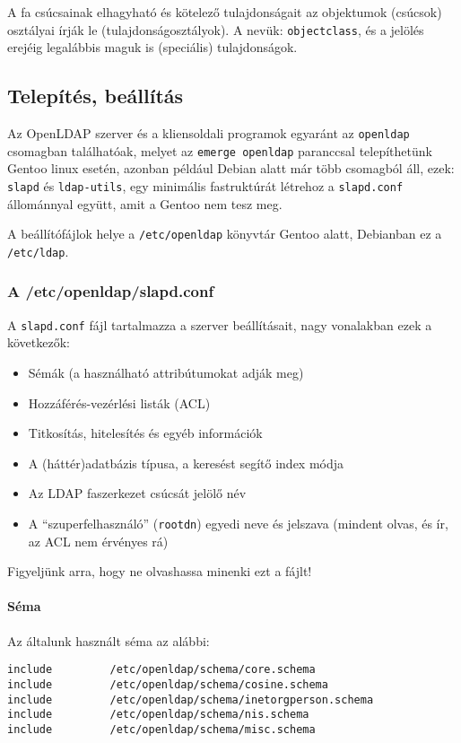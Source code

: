 \documentclass[fleqn,10pt,a4paper,titlepage]{article}
\begin{document}
  A fa csúcsainak elhagyható és kötelező tulajdonságait az objektumok (csúcsok) osztályai írják le
  (tulajdonságosztályok). A nevük: \texttt{objectclass}, és a jelölés erejéig legalábbis  maguk is (speciális)
  tulajdonságok.


  \subsection{Telepítés, beállítás}
  Az OpenLDAP szerver és a kliensoldali programok egyaránt az \texttt{openldap} csomagban találhatóak, melyet az
  \texttt{emerge openldap} paranccsal telepíthetünk Gentoo linux esetén, azonban például Debian alatt már több csomagból
  áll, ezek: \texttt{slapd} és \texttt{ldap-utils}, egy minimális fastruktúrát létrehoz a \texttt{slapd.conf}
  állománnyal együtt, amit a Gentoo nem tesz meg.

  A beállítófájlok helye a \texttt{/etc/openldap} könyvtár Gentoo alatt, Debianban ez a \texttt{/etc/ldap}.

  \subsubsection{A /etc/openldap/slapd.conf}
  A \texttt{slapd.conf} fájl tartalmazza a szerver beállításait, nagy vonalakban ezek a következők:
  
  \begin{itemize}
  \item Sémák (a használható attribútumokat adják meg)
  \item Hozzáférés-vezérlési listák (ACL)
  \item Titkosítás, hitelesítés és egyéb információk
  \item A (háttér)adatbázis típusa, a keresést segítő index módja
  \item Az LDAP faszerkezet csúcsát jelölő név
  \item A ``szuperfelhasználó'' (\texttt{rootdn}) egyedi neve és jelszava (mindent olvas, és ír, az ACL nem érvényes rá)
  \end{itemize}  

  Figyeljünk arra, hogy ne olvashassa minenki ezt a fájlt!

  \paragraph{Séma} Az általunk használt séma az alábbi:

\begin{Verbatim}
include         /etc/openldap/schema/core.schema
include         /etc/openldap/schema/cosine.schema
include         /etc/openldap/schema/inetorgperson.schema
include         /etc/openldap/schema/nis.schema
include         /etc/openldap/schema/misc.schema
\end{Verbatim}
  
\end{document}
